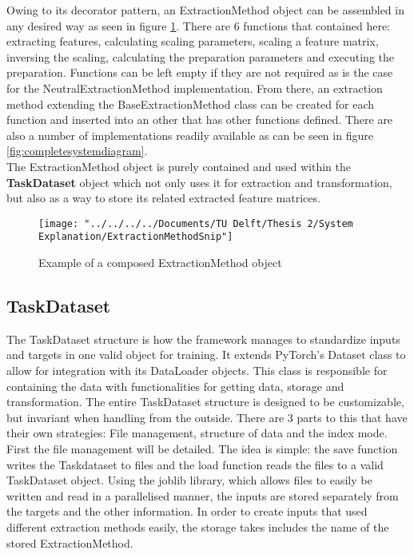 Owing to its decorator pattern, an ExtractionMethod object can be assembled in any desired way as seen in figure \ref{fig:extractionmethodsnip}. There are 6 functions that contained here: extracting features, calculating scaling parameters, scaling a feature matrix, inversing the scaling, calculating the preparation parameters and executing the preparation. Functions can be left empty if they are not required as is the case for the NeutralExtractionMethod implementation. From there, an extraction method extending the BaseExtractionMethod class can be created for each function and inserted into an other that has other functions defined. There are also a number of implementations readily available as can be seen in figure \ref{fig:completesystemdiagram}.\\

The ExtractionMethod object is purely contained and used within the \textbf{TaskDataset} object which not only uses it for extraction and transformation, but also as a way to store its related extracted feature matrices.\\


\begin{figure}
	\centering
	\texttt{[image: "../../../../Documents/TU Delft/Thesis 2/System Explanation/ExtractionMethodSnip"]}
	\caption{Example of a composed ExtractionMethod object}
	\label{fig:extractionmethodsnip}
\end{figure}


\subsection{TaskDataset} \label{Impl:DataRead:TaskDataset}



The TaskDataset structure is how the framework manages to standardize inputs and targets in one valid object for training. It extends PyTorch's Dataset class to allow for integration with its DataLoader objects. This class is responsible for containing the data with functionalities for getting data, storage and transformation. The entire TaskDataset structure is designed to be customizable, but invariant when handling from the outside. There are 3 parts to this that have their own strategies: File management, structure of data and the index mode. \\

First the file management will be detailed. The idea is simple: the save function writes the Taskdataset to files and the load function reads the files to a valid TaskDataset object. Using the joblib library, which allows files to easily be written and read in a parallelised manner, the inputs are stored separately from the targets and the other information. In order to create inputs that used different extraction methods easily, the storage takes includes the name of the stored ExtractionMethod. \\

